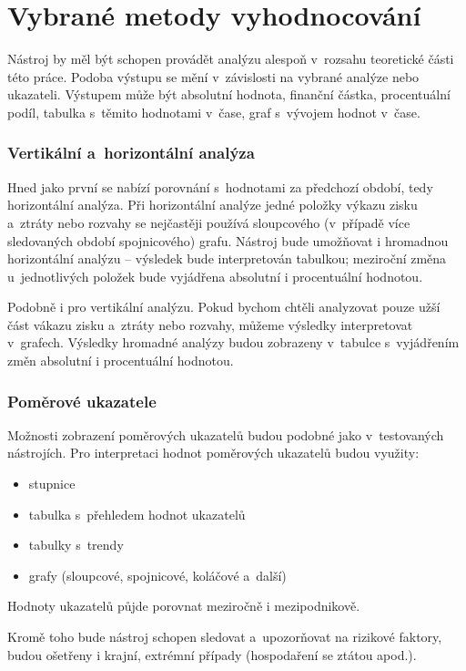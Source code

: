 \section{Vybrané metody vyhodnocování}
Nástroj by měl být schopen provádět analýzu alespoň v~rozsahu teoretické části této práce. Podoba výstupu se mění v~závislosti na vybrané analýze nebo ukazateli. Výstupem může být absolutní hodnota, finanční částka, procentuální podíl, tabulka s~těmito hodnotami v~čase, graf s~vývojem hodnot v~čase. 


\subsubsection{Vertikální a~horizontální analýza}
Hned jako první se nabízí porovnání s~hodnotami za předchozí období, tedy horizontální analýza. Při horizontální analýze jedné položky výkazu zisku a~ztráty nebo rozvahy se nejčastěji používá sloupcového (v~případě více sledovaných období spojnicového) grafu. Nástroj bude umožňovat i hromadnou horizontální analýzu -- výsledek bude interpretován tabulkou; meziroční změna u~jednotlivých položek bude vyjádřena absolutní i procentuální hodnotou. 

Podobně i pro vertikální analýzu. Pokud bychom chtěli analyzovat pouze užší část vákazu zisku a~ztráty nebo rozvahy, můžeme výsledky interpretovat v~grafech. Výsledky hromadné analýzy budou zobrazeny v~tabulce s~vyjádřením změn absolutní i procentuální hodnotou.

\subsubsection{Poměrové ukazatele}
Možnosti zobrazení poměrových ukazatelů budou podobné jako v~testovaných nástrojích.
Pro interpretaci hodnot poměrových ukazatelů budou využity:
\begin{itemize}
	\item stupnice
	\item tabulka s~přehledem hodnot ukazatelů
	\item tabulky s~trendy
	\item grafy (sloupcové, spojnicové, koláčové a~další)
\end{itemize}

Hodnoty ukazatelů půjde porovnat meziročně i mezipodnikově.

Kromě toho bude nástroj schopen sledovat a~upozorňovat na rizikové faktory, budou ošetřeny i krajní, extrémní případy (hospodaření se ztátou apod.).

